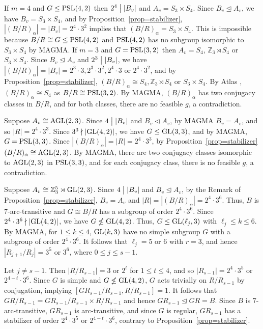 \documentclass[12pt]{article}
\def\a{\alpha} \def\b{\beta} \def\g{\gamma} \def\d{\delta} \def\e{\varepsilon}
\def\di{\bigm|} \def\lg{\langle} \def\rg{\rangle}
\def\PSL{\hbox{\rm PSL}}\def\PSU{\hbox{\rm PSU}}
\def\AGL{\hbox{\rm AGL}}
\def\mz{{\mathbb Z}}
\begin{document}
If $m=4$ and $G\leq \PSL(4,2)$  then $2^4\di |B_v|$ and $A_v=S_3\times S_4$. Since $B_v\unlhd A_v$, we have $B_v=S_3\times S_4$, and by Proposition~\ref{prop=stabilizer}, $|(B/R)_\a|=|B_v|=2^4\cdot 3^2$ implies that  $(B/R)_\a=S_3\times S_4$. This is impossible because $B/R\cong G\leq \PSL(4,2)$ and $\PSL(4,2)$ has no subgroup isomorphic to $S_3\times S_4$ by MAGMA.
If $m=3$ and $G=\PSL(3,2)$ then $A_v=S_4$, $\mz_3\rtimes S_4$ or $ S_3\times S_4$. Since $B_v\unlhd A_v$ and $2^3\di |B_v|$, we have $|(B/R)_\a|=|B_v|=2^3\cdot 3, 2^3\cdot 3^2, 2^4\cdot 3$ or $2^4\cdot 3^2$, and by Proposition~\ref{prop=stabilizer}, $(B/R)_\a\cong S_4, \mz_3\rtimes S_4$ or $S_3\times S_4$. By Atlas \cite[pp.3]{Atlas}, $(B/R)_\a\cong S_4$ as $B/R\cong \PSL(3,2)$. By MAGMA, $(B/R)_\a$ has two conjugacy classes in $B/R$, and for both classes, there are no feasible $g$, a contradiction.

Suppose $A_v\cong\rm AGL(2,3)$. Since $4\di |B_v|$ and $B_v\lhd A_v$, by MAGMA $B_v=A_v$, and so $|R|=2^4\cdot 3^3$. Since $3^3\nmid |\hbox{\rm GL}(4,2)|$, we have $G\leq \hbox{\rm GL}(3,3)$, and by MAGMA, $G=\PSL(3,3)$.  Since $|(B/R)_\a|=|R|=2^4\cdot 3^3$, by Proposition~\ref{prop=stabilizer} $(B/R)_\a\cong \rm AGL(2,3)$. By MAGMA, there are two conjugacy classes isomorphic to $\AGL(2,3)$ in $\PSL(3,3)$, and  for each conjugacy class, there is no feasible $g$, a contradiction.

Suppose $A_v\cong \mz_3^5 \rtimes \rm GL(2,3)$. Since $4\di |B_v|$ and $B_v\unlhd A_v$, by the Remark of Proposition~\ref{prop=stabilizer}, $B_v=A_v$ and $|R|=|(B/R)_\a|=2^4\cdot 3^6$. Thus, $B$ is $7$-arc-transitive and $G\cong B/R$ has a subgroup of order $2^4\cdot 3^6$. Since $2^4\cdot3^6\nmid |\hbox{\rm GL}(4,2)|$, we have  $G\nleq \hbox{\rm GL}(4,2)$. Thus, $G\leq \hbox{\rm GL}(\ell_j,3)$ with $\ell_j\leq k\leq 6$. By MAGMA, for $1\leq k\leq 4$, $\hbox{\rm GL}(k,3)$  have no simple subgroup $G$ with a subgroup of order $2^4\cdot 3^6$. It follows that $\ell_j=5$ or $6$ with $r=3$, and hence $|R_{j+1}/R_j|=3^5$ or $3^6$, where $0\leq j\leq s-1$.

Let $j\not=s-1$. Then $|R/R_{s-1}|=3$ or $2^t$ for $1\leq t\leq 4$, and so $|R_{s-1}|=2^4\cdot 3^5$ or $2^{4-t}\cdot 3^6$. Since $G$ is simple and $G\nleq \hbox{\rm GL}(4,2)$, $G$ acts trivially on $R/R_{s-1}$ by conjugation, implying $[GR_{s-1}/R_{s-1},R/R_{s-1}]=1$. It follows that $GR/R_{s-1}=GR_{s-1}/R_{s-1}\times R/R_{s-1}$ and hence $GR_{s-1}\unlhd GR=B$. Since $B$ is $7$-arc-transitive, $GR_{s-1}$ is arc-transitive, and since $G$ is regular, $GR_{s-1}$ has a stabilizer of order $2^4\cdot 3^5$ or $2^{4-t}\cdot3^6$, contrary to Proposition~\ref{prop=stabilizer}.
\end{document}
